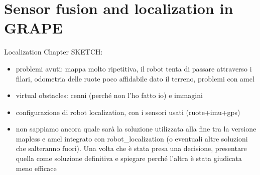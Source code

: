 
\chapter{Sensor fusion and localization in GRAPE} \label{chap:localization}

Localization Chapter SKETCH:
\begin{itemize}
	\item problemi avuti: mappa molto ripetitiva, il robot tenta di passare attraverso i filari, odometria delle ruote poco affidabile dato il terreno, problemi con amcl
	\item virtual obstacles: cenni (perché non l'ho fatto io) e immagini
	\item configurazione di robot localization, con i sensori usati (ruote+imu+gps)
	\item non sappiamo ancora quale sarà la soluzione utilizzata alla fine tra la versione mapless e amcl integrato con robot\_localization (o eventuali altre soluzioni che salteranno fuori). Una volta che è stata presa una decisione, presentare quella come soluzione definitiva e spiegare perché l'altra è stata giudicata meno efficace
\end{itemize}

